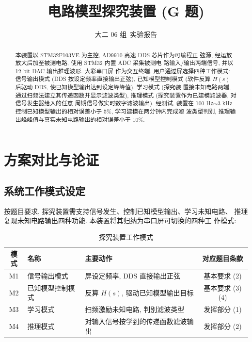 \documentclass[a4paper]{article}
\title{\Huge 电路模型探究装置 (G 题)}
\date{\LARGE  大二 06 组\ 实验报告}
\begin{document}
	\maketitle
	\vspace{6em}

	\begin{abstract}
		本装置以 STM32F103VE 为主控, AD9910 高速 DDS 芯片作为可编程正
		弦源, 经运放放大后加至被测电路, 使用 STM32 内置 ADC 采集被测电
		路输入/输出两端信号, 并以 12 bit DAC 输出推理波形. 大彩串口屏
		作为交互终端, 用户通过屏选择四种工作模式: 信号输出模式 (DDS
		按设定频率直接输出正弦), 已知模型控制模式 (软件反算 $H(s)$
		后驱动 DDS, 使已知模型输出达到设定峰峰值), 学习模式 (探究装
		置接未知电路两端, 通过扫频法建立其传递函数并显示滤波类型),
		推理模式 (探究装置作为已建模滤波器, 对信号发生器给入的任意
		周期信号做实时数字滤波输出). 经测试, 装置在 100 Hz$\sim$3 kHz
		控制已知模型输出的相对误差小于 5\%, 学习建模在两分钟内完成滤
		波类型判别, 推理输出峰峰值与真实未知电路输出的相对误差小于
		10\%.
		\\
		\newline
	\end{abstract}

	\newpage
	\tableofcontents


\newpage
\section{方案对比与论证}

\subsection{系统工作模式设定}

按题目要求, 探究装置需支持信号发生、控制已知模型输出、学习未知电路、
推理复现未知电路输出四种功能. 本装置将其归纳为串口屏可切换的四种工
作模式:

\begin{table}[H]
\centering
\caption{探究装置工作模式}
\begin{tabular}{cllc}
\toprule
模式 & 名称 & 主要动作 & 对应题目条款 \\
\midrule
M1 & 信号输出模式    & 屏设定频率, DDS 直接输出正弦        & 基本要求 (2) \\
M2 & 已知模型控制模式 & 反算 $H(s)$, 驱动已知模型输出目标 & 基本要求 (3)(4) \\
M3 & 学习模式        & 扫频激励未知电路, 判别滤波类型      & 发挥部分 (1) \\
M4 & 推理模式        & 对输入信号按学到的传递函数滤波输出  & 发挥部分 (2) \\
\bottomrule
\end{tabular}
\end{table}
\end{document}
